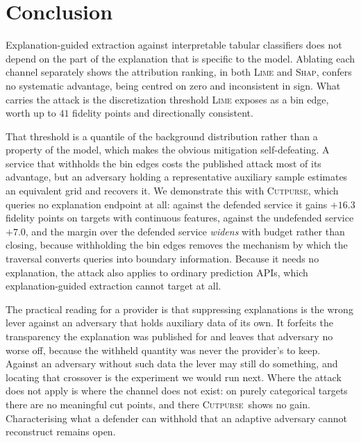 \documentclass[sigconf,anonymous,review]{acmart}
\newcommand{\sys}{\textsc{Cutpurse}}
\begin{document}
\section{Conclusion}
Explanation-guided extraction against interpretable tabular classifiers does not depend on the part of
the explanation that is specific to the model. Ablating each channel separately shows the attribution
ranking, in both \textsc{Lime} and \textsc{Shap}, confers no systematic advantage, being centred on
zero and inconsistent in sign. What carries the attack is the discretization threshold \textsc{Lime}
exposes as a bin edge, worth up to $41$ fidelity points and directionally consistent.

That threshold is a quantile of the background distribution rather than a property of the model, which
makes the obvious mitigation self-defeating. A service that withholds the bin edges costs the
published attack most of its advantage, but an adversary holding a representative auxiliary sample
estimates an equivalent grid and recovers it. We demonstrate this with \sys, which queries no
explanation endpoint at all: against the defended service it gains $+16.3$ fidelity points on targets
with continuous features, against the undefended service $+7.0$, and the margin over the defended
service \emph{widens} with budget rather than closing, because withholding the bin edges removes the
mechanism by which the traversal converts queries into boundary information. Because it needs no
explanation, the attack also applies to ordinary prediction APIs, which explanation-guided extraction
cannot target at all.

The practical reading for a provider is that suppressing explanations is the wrong lever against an
adversary that holds auxiliary data of its own. It forfeits the transparency the explanation was
published for and leaves that adversary no worse off, because the withheld quantity was never the
provider's to keep. Against an adversary without such data the lever may still do something, and
locating that crossover is the experiment we would run next. Where the attack does not apply is where the
channel does not exist: on purely categorical targets there are no meaningful cut points, and there
\sys\ shows no gain. Characterising what a defender can withhold that an adaptive adversary cannot
reconstruct remains open.

\appendix
\end{document}
